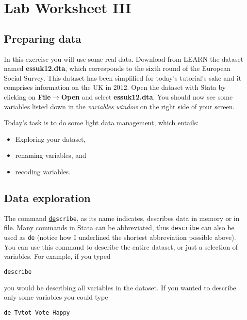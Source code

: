 \documentclass{article}
\begin{document}
\pagestyle{fancy}
\fancyhf{}

\section*{\hfil Lab Worksheet III \hfil}
\subsection*{Preparing data}

In this exercise you will use some real data. Download from LEARN the dataset named \textbf{essuk12.dta}, which corresponds to the sixth round of the European Social Survey. This dataset has been simplified for today's tutorial's sake and it comprises information on the UK in 2012. Open the dataset with Stata by clicking on \textbf{File$\to$Open} and select \textbf{essuk12.dta}. You should now see some variables listed down in the \textit{variables window} on the right side of your screen.

Today's task is to do some light data management, which entails:

\begin{itemize}
	\item Exploring your dataset,
	\item renaming variables, and
	\item recoding variables.
\end{itemize}

\subsection*{Data exploration}
The command \texttt{\underline{de}scribe}, as its name indicates, describes data in memory or in file. Many commands in Stata can be abbreviated, thus \texttt{describe} can also be used as \texttt{de} (notice how I underlined the shortest abbreviation possible above). You can use this command to describe the entire dataset, or just a selection of variables. For example, if you typed

\begin{lstlisting}
describe
\end{lstlisting}

you would be describing all variables in the dataset. If you wanted to describe only some variables you could type

\begin{lstlisting}
de Tvtot Vote Happy
\end{lstlisting}
\end{document}
